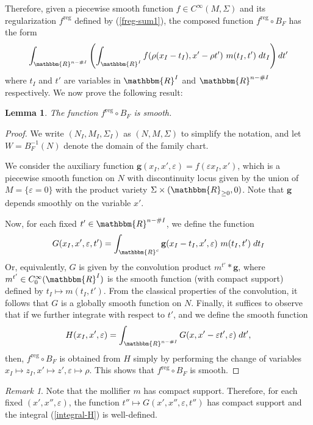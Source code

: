 \documentclass[11pt,psamsfonts]{article}
\newtheorem{Lemma}[Theorem]{Lemma}
\theoremstyle{definition}
\theoremstyle{remark}
\newtheorem{Remark}[Theorem]{Remark}
\newcommand{\cR}{\ensuremath{\mathbbm{R}}}
\newcommand{\eps}{\varepsilon }
\newcommand{\vf}{f}
\newcommand{\reg}{\mathrm{reg}}
\begin{document}
Therefore, given a piecewise smooth function $f\in C^\infty(M,\Sigma)$ and its regularization $f^\reg$ defined by (\ref{freg-sum1}), the composed function 
$f^\reg \circ B_F$ has the form
\begin{equation}\label{integral-conv-reg}
\int_{\cR^{n - \# I}} \left( \int_{\cR^I} \vf(\rho (x_I-t_I),x'-\rho t')\ m(t_I,t')\; dt_I \right) dt'
\end{equation}
where $t_I$ and $t'$ are variables in $\cR^I$ and $\cR^{n-\#I}$ respectively. We now prove the following result: 
\begin{Lemma}\label{Lemma-partial-conv}
The function $f^\reg\circ B_F$ is smooth.
\end{Lemma}
\begin{proof}
We write $(N_I,M_I,\Sigma_I)$ as $(N,M,\Sigma)$ to simplify the notation, and let $W=B_F^{-1}(N)$ denote the domain of the family chart.  

We consider the auxiliary function $\mathbf{g}(x_I,x',\eps) = \vf(\eps x_I,x')$, which is a piecewise smooth function on $N$ with discontinuity locus given by the union of $M=\{\eps = 0\}$ with the product variety $\Sigma \times (\cR_{\ge 0},0)$. Note that $\mathbf{g}$ depends smoothly on the variable $x'$. 

Now, for each fixed $t' \in \cR^{n-\# I}$, we define the function  
$$
G(x_I,x',\eps,t') =  \int_{\cR^{c}} \mathbf{g}(x_I-t_I,x',\eps)\ m(t_I,t')\; dt_I 
$$
Or, equivalently, $G$ is given by the convolution product  $m^{t'} \ast \mathbf{g}$, where $m^{t'}\in C^\infty_0(\cR^{I})$ is the smooth function (with compact support) defined by $t_I \mapsto m(t_I,t')$. From the classical properties of the convolution, it follows that $G $ is a globally smooth function on $N$. Finally, it suffices to observe that if we further integrate with respect to $t'$, and we define the smooth function
\begin{equation}\label{integral-H}
H(x_I,x',\eps) = \int_{\cR^{n-\# I}} G(x,x'-\eps t',\eps)\; dt',
\end{equation}
then, $f^\reg \circ B_F$ is obtained from $H$ simply by performing the change of variables $x_I \mapsto z_I, x'\mapsto z',\eps \mapsto \rho$. This shows that $f^\reg \circ B_F$ is smooth.
\end{proof}
\begin{Remark}
Note that the mollifier $m$ has compact support. Therefore, for each fixed $(x',x'',\eps)$, 
the function $t'' \mapsto G(x',x'',\eps,t'')$ has compact support and the integral (\ref{integral-H}) is well-defined. \\
\end{Remark}
\end{document}
